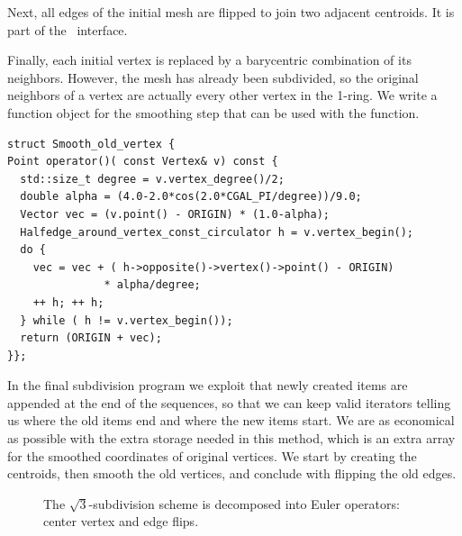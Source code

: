 \noindent
Next, all edges of the initial mesh are flipped to join two
adjacent centroids. It is part of the \cgalpoly\ interface.

Finally, each initial vertex is replaced by a barycentric combination
of its neighbors. However, the mesh has already been subdivided, so
the original neighbors of a vertex are actually every other vertex in
the 1-ring. We write a function object for the smoothing step that
can be used with the  function.

\begin{lstlisting}
struct Smooth_old_vertex {
Point operator()( const Vertex& v) const {
  std::size_t degree = v.vertex_degree()/2;
  double alpha = (4.0-2.0*cos(2.0*CGAL_PI/degree))/9.0;
  Vector vec = (v.point() - ORIGIN) * (1.0-alpha);
  Halfedge_around_vertex_const_circulator h = v.vertex_begin();
  do {
    vec = vec + ( h->opposite()->vertex()->point() - ORIGIN) 
               * alpha/degree;
    ++ h; ++ h;
  } while ( h != v.vertex_begin());
  return (ORIGIN + vec);
}};
\end{lstlisting}\vspace*{-3mm}

\noindent
In the final subdivision program we exploit that newly created items
are appended at the end of the sequences, so that we can keep valid
iterators telling us where the old items end and where the new items
start. We are as economical as possible with the extra
storage needed in this method, which is an extra array for the
smoothed coordinates of original vertices. We start by creating the
centroids, then smooth the old vertices, and conclude with flipping
the old edges.

\begin{figure}[tb]
    \caption{The $\sqrt{3}$-subdivision scheme is decomposed into
             Euler operators: center vertex and edge flips.}
    \label{fig:sqrt3_basic}\vspace*{-2mm}
\end{figure}


